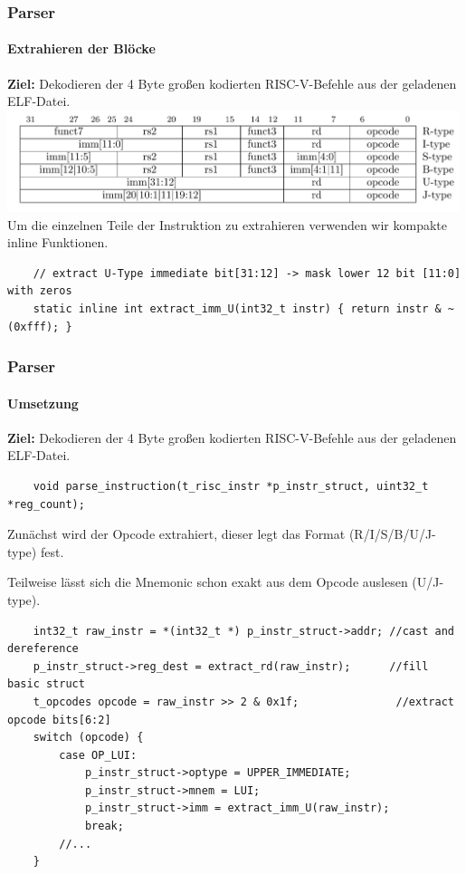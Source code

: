 \documentclass[german]{tum-presentation}
\begin{document}
\begin{frame}[fragile]
	\frametitle{Parser}
	\framesubtitle{Extrahieren der Blöcke}
	\textbf{Ziel:} Dekodieren der 4 Byte großen kodierten RISC-V-Befehle aus der geladenen ELF-Datei.
	\includegraphics[width=0.99\textwidth]{diagrams/optypes}
	\pause
	Um die einzelnen Teile der Instruktion zu extrahieren verwenden wir kompakte inline Funktionen. 
	\begin{lstlisting}
	// extract U-Type immediate bit[31:12] -> mask lower 12 bit [11:0] with zeros
	static inline int extract_imm_U(int32_t instr) { return instr & ~(0xfff); }
	\end{lstlisting}
\end{frame}

\begin{frame}[fragile]
	\frametitle{Parser}
	\framesubtitle{Umsetzung}
	\textbf{Ziel:} Dekodieren der 4 Byte großen kodierten RISC-V-Befehle aus der geladenen ELF-Datei.
	\begin{lstlisting}
	void parse_instruction(t_risc_instr *p_instr_struct, uint32_t *reg_count);
	\end{lstlisting}
	Zunächst wird der Opcode extrahiert, dieser legt das Format (R/I/S/B/U/J-type) fest.
	
	Teilweise lässt sich die Mnemonic schon exakt aus dem Opcode auslesen (U/J-type).
	\begin{lstlisting}
    int32_t raw_instr = *(int32_t *) p_instr_struct->addr; //cast and dereference
    p_instr_struct->reg_dest = extract_rd(raw_instr);      //fill basic struct
    t_opcodes opcode = raw_instr >> 2 & 0x1f;				//extract opcode bits[6:2]
    switch (opcode) {
        case OP_LUI:
            p_instr_struct->optype = UPPER_IMMEDIATE;
            p_instr_struct->mnem = LUI;
            p_instr_struct->imm = extract_imm_U(raw_instr);
            break;
        //...
    }
	\end{lstlisting}
\end{frame}
\end{document}
